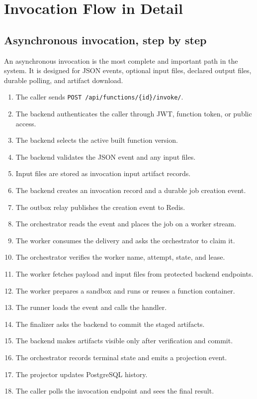 \documentclass[12pt,a4paper]{report}
\newcommand{\api}[1]{\texttt{#1}}
\begin{document}
\clearpage

\chapter{Invocation Flow in Detail}

\section{Asynchronous invocation, step by step}

An asynchronous invocation is the most complete and important path in the
system. It is designed for JSON events, optional input files, declared output
files, durable polling, and artifact download.

\begin{enumerate}[leftmargin=1.2cm]
  \item The caller sends \api{POST /api/functions/\{id\}/invoke/}.
  \item The backend authenticates the caller through JWT, function token, or public access.
  \item The backend selects the active built function version.
  \item The backend validates the JSON event and any input files.
  \item Input files are stored as invocation input artifact records.
  \item The backend creates an invocation record and a durable job creation event.
  \item The outbox relay publishes the creation event to Redis.
  \item The orchestrator reads the event and places the job on a worker stream.
  \item The worker consumes the delivery and asks the orchestrator to claim it.
  \item The orchestrator verifies the worker name, attempt, state, and lease.
  \item The worker fetches payload and input files from protected backend endpoints.
  \item The worker prepares a sandbox and runs or reuses a function container.
  \item The runner loads the event and calls the handler.
	
  \item The finalizer asks the backend to commit the staged artifacts.
  \item The backend makes artifacts visible only after verification and commit.
  \item The orchestrator records terminal state and emits a projection event.
  \item The projector updates PostgreSQL history.
  \item The caller polls the invocation endpoint and sees the final result.
\end{enumerate}
\end{document}
